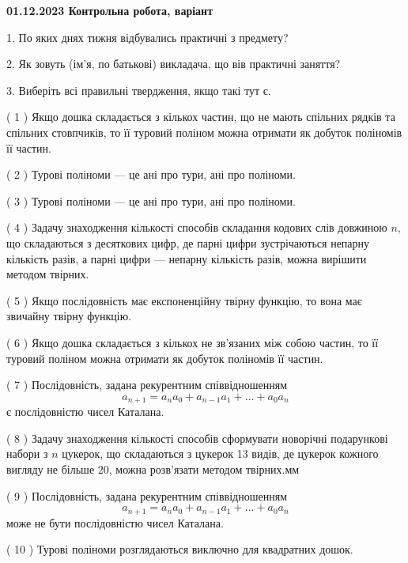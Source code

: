 \documentclass[12pt, ukrainian]{article}
\begin{document}
\vspace{4mm}
\newpage
\begin {large}

\textbf{01.12.2023 Контрольна робота, варіант  }\par


{
1. По яких днях тижня відбувались практичні з предмету?



\vspace{5mm}
2. Як зовуть (ім'я, по батькові) викладача, що вів практичні заняття?



\vspace{5mm}
3. Виберіть всі правильні твердження, якщо такі тут є.\par
\vspace{2mm}
( 1 ) Якщо дошка складається з кількох частин, що не мають спільних рядків та спільних стовпчиків, то її туровий поліном можна отримати як добуток поліномів її частин.%

( 2 ) Турові поліноми --- це ані про тури, ані про поліноми.%

( 3 ) Турові поліноми --- це ані про тури, ані про поліноми.%

( 4 ) Задачу знаходження кількості способів складання кодових слів довжиною $n$, що складаються з десяткових цифр, де парні цифри зустрічаються непарну кількість разів, а парні цифри — непарну кількість разів, можна вирішити методом твірних.%

( 5 ) Якщо послідовність має експоненційну твірну функцію, то вона має звичайну твірну функцію.%

( 6 ) Якщо дошка складається з кількох не зв’язаних між собою частин, то її туровий поліном можна отримати як добуток поліномів її частин.%

( 7 ) Послідовність, задана рекурентним співвідношенням $$a_{n+1}=a_{n}a_{0}+a_{n-1}a_{1}+\ldots+a_0a_{n}$$ є послідовністю чисел Каталана.%

( 8 ) Задачу знаходження кількості способів сформувати новорічні подарункові набори з $n$ цукерок, що складаються з цукерок 13 видів, де цукерок кожного вигляду не більше 20, можна розв’язати методом твірних.мм%

( 9 ) Послідовність, задана рекурентним співвідношенням $$a_{n+1}=a_{n}a_{0}+a_{n-1}a_{1}+\ldots+a_0a_{n}$$ може не бути послідовністю чисел Каталана.%

( 10 ) Турові поліноми розглядаються виключно для квадратних дошок.%
}
\end {large}
\end{document}
